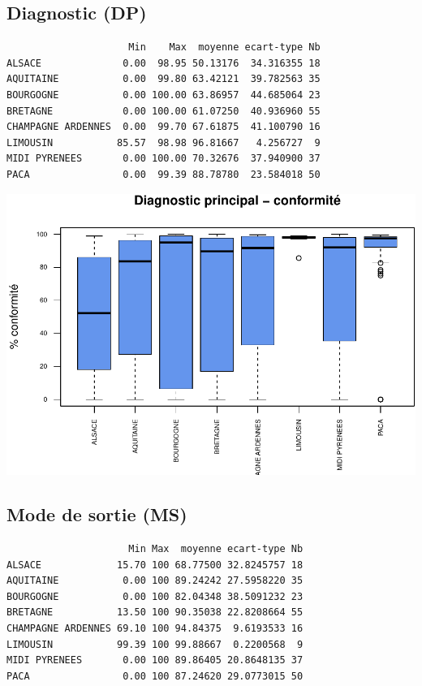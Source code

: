 \documentclass[]{article}
\begin{document}
\subsection{Diagnostic (DP)}\label{diagnostic-dp-1}

\begin{verbatim}
                     Min    Max  moyenne ecart-type Nb
ALSACE              0.00  98.95 50.13176  34.316355 18
AQUITAINE           0.00  99.80 63.42121  39.782563 35
BOURGOGNE           0.00 100.00 63.86957  44.685064 23
BRETAGNE            0.00 100.00 61.07250  40.936960 55
CHAMPAGNE ARDENNES  0.00  99.70 67.61875  41.100790 16
LIMOUSIN           85.57  98.98 96.81667   4.256727  9
MIDI PYRENEES       0.00 100.00 70.32676  37.940900 37
PACA                0.00  99.39 88.78780  23.584018 50
\end{verbatim}

\includegraphics{septembre2015_files/figure-latex/unnamed-chunk-27-1.pdf}

\subsection{Mode de sortie (MS)}\label{mode-de-sortie-ms-1}

\begin{verbatim}
                     Min Max  moyenne ecart-type Nb
ALSACE             15.70 100 68.77500 32.8245757 18
AQUITAINE           0.00 100 89.24242 27.5958220 35
BOURGOGNE           0.00 100 82.04348 38.5091232 23
BRETAGNE           13.50 100 90.35038 22.8208664 55
CHAMPAGNE ARDENNES 69.10 100 94.84375  9.6193533 16
LIMOUSIN           99.39 100 99.88667  0.2200568  9
MIDI PYRENEES       0.00 100 89.86405 20.8648135 37
PACA                0.00 100 87.24620 29.0773015 50
\end{verbatim}
\end{document}
